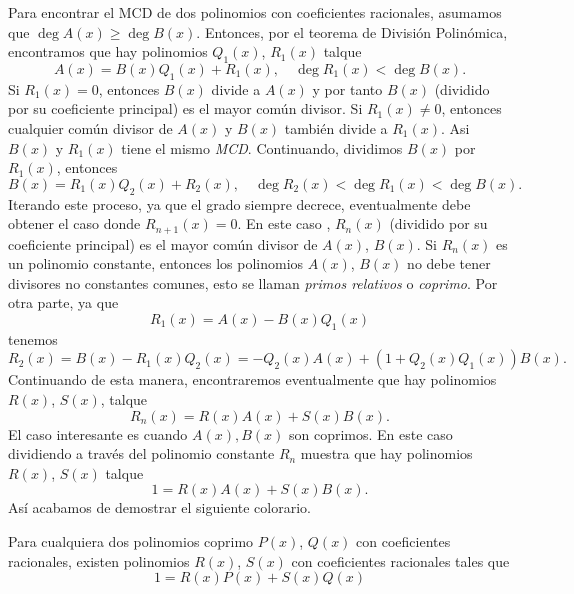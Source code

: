 Para encontrar el MCD de dos polinomios con coeficientes racionales, asumamos que $\deg{A(x)} \geq \deg{B(x)}$.
Entonces, por el teorema de División Polinómica, encontramos que hay polinomios $Q_1(x)$, $R_1(x)$ talque
\[
    A(x) = B(x) Q_1(x) + R_1(x),\quad \deg{R_1(x)} < \deg{B(x)}.
\]
Si $R_1(x) = 0$, entonces $B(x)$ divide a $A(x)$ y por tanto $B(x)$ (dividido por su coeficiente principal) es el mayor común divisor.
Si $R_1(x) \neq 0$, entonces cualquier común divisor de $A(x)$ y $B(x)$ también divide a $R_1(x)$.
Asi $B(x)$ y $R_1(x)$ tiene el mismo \textit{MCD}.
Continuando, dividimos $B(x)$ por $R_1(x)$, entonces
\[
    B(x) = R_1(x) Q_2(x) + R_2(x), \quad \deg{R_2(x)} < \deg{R_1(x)} < \deg{B(x)}.
\]
Iterando este proceso, ya que el grado siempre decrece, eventualmente debe obtener el caso donde $R_{n + 1}(x) = 0$.
En este caso , $R_n(x)$ (dividido por su coeficiente principal) es el mayor común divisor de $A(x)$, $B(x)$.
Si $R_n (x)$ es un polinomio constante, entonces los polinomios $A(x)$, $B(x)$ no debe tener divisores no constantes comunes, esto se llaman \textit{primos relativos} o \textit{coprimo}.
Por otra parte, ya que
\[
    R_1(x) = A(x) - B(x) Q_1(x)
\]
tenemos
\[
    R_2 (x) = B(x) - R_1(x) Q_2(x) = - Q_2(x) A(x) + \left(1 + Q_2(x) Q_1(x)\right) B(x).
\]
Continuando de esta manera, encontraremos eventualmente que hay polinomios $R(x)$, $S(x)$, talque
\[
    R_n(x) = R(x) A(x) + S(x) B(x).
\]
El caso interesante es cuando $A(x), B(x)$ son coprimos.
En este caso dividiendo a través del polinomio constante $R_n$ muestra que hay polinomios $R(x)$, $S(x)$ talque
\[
    1 = R(x) A(x) + S(x) B(x).
\]
Así acabamos de demostrar el siguiente colorario.

\begin{corollary}
    Para cualquiera dos polinomios coprimo $P(x)$, $Q(x)$ con coeficientes racionales,
    existen polinomios $R(x)$, $S(x)$ con coeficientes racionales tales que
    \[
        1 = R(x) P(x) + S(x) Q(x)
    \]
\end{corollary}

